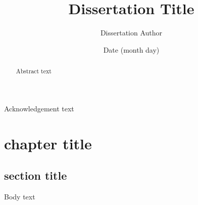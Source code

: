 \documentclass[12pt, pdftex]{cmu_mse_dissertation}
\begin{document}
 

\frontmatter

\pagestyle{empty}

\title{\bf \textsf{Dissertation Title}}
\author{Dissertation Author}
\date{Date (month day)}


\support{}
\disclaimer{}


\maketitle

\begin{keywordspage}

\end{keywordspage}
\pagestyle{plain} %


\begin{abstract}
Abstract text
\end{abstract}

\begin{acknowledgments}
Acknowledgement text
\end{acknowledgments}

\tableofcontents
\listoffigures
\listoftables

\mainmatter

\chapter{chapter title}
\section{section title}
Body text \cite{ref1}
%
%
%
%
%
\end{document}
